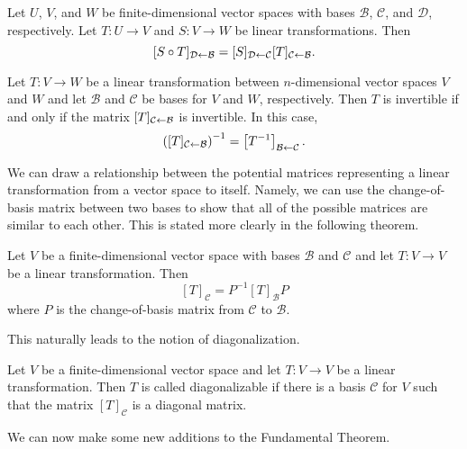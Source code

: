 \documentclass[../m73main.tex]{subfiles}
\begin{document}
\begin{theorem}
	Let $U$, $V$, and $W$ be finite-dimensional vector spaces with bases $\mathcal{B}$, $\mathcal{C}$, and $\mathcal{D}$, respectively.
	Let $T : U \to V$ and $S : V \to W$ be linear transformations.
	Then
	\[ [S \circ T]_{\mathcal{D} \leftarrow \mathcal{B}} = [S]_{\mathcal{D} \leftarrow \mathcal{C}} [T]_{\mathcal{C} \leftarrow \mathcal{B}}. \]
\end{theorem}

\begin{theorem}
	Let $T : V \to W$ be a linear transformation between $n$-dimensional vector spaces $V$ and $W$ and let $\mathcal{B}$ and $\mathcal{C}$ be bases for $V$ and $W$, respectively.
	Then $T$ is invertible if and only if the matrix $[T]_{\mathcal{C} \leftarrow \mathcal{B}}$ is invertible.
	In this case,
	\[ \left( [T]_{\mathcal{C} \leftarrow \mathcal{B}} \right)^{-1} = \left[ T^{-1} \right]_{\mathcal{B} \leftarrow \mathcal{C}}. \]
\end{theorem}

We can draw a relationship between the potential matrices representing a linear transformation from a vector space to itself.
Namely, we can use the change-of-basis matrix between two bases to show that all of the possible matrices are similar to each other.
This is stated more clearly in the following theorem.

\begin{theorem}
	Let $V$ be a finite-dimensional vector space with bases $\mathcal{B}$ and $\mathcal{C}$ and let $T : V \to V$ be a linear transformation.
	Then
	\[ [T]_{\mathcal{C}} = P^{-1}[T]_{\mathcal{B}}P \]
	where $P$ is the change-of-basis matrix from $\mathcal{C}$ to $\mathcal{B}$.
\end{theorem}

This naturally leads to the notion of diagonalization.

\begin{definition}
	Let $V$ be a finite-dimensional vector space and let $T : V \to V$ be a linear transformation.
	Then $T$ is called diagonalizable if there is a basis $\mathcal{C}$ for $V$ such that the matrix $[T]_{\mathcal{C}}$ is a diagonal matrix.
\end{definition}

We can now make some new additions to the Fundamental Theorem.
\end{document}
